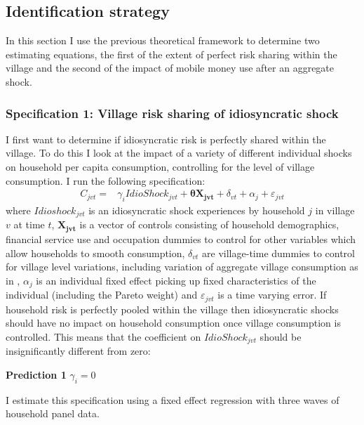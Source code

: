 \clearpage
\subsection{Identification strategy} 
In this section I use the previous theoretical framework to determine two estimating equations, the first of the extent of perfect risk sharing within the village and the second of the impact of mobile money use after an aggregate shock. 

\subsubsection{Specification 1: Village risk sharing of idiosyncratic shock}
I first want to determine if idiosyncratic risk is perfectly shared within the village. To do this I look at the impact of a variety of different individual shocks on household per capita consumption, controlling for the level of village consumption. I run the following specification: 
\begin{align} \label{eq: idioshock}
C_{jvt} = &   \gamma_i IdioShock_{jvt}  + \bm{\theta X_{jvt}}   +  \delta_{vt} + \alpha_j + \varepsilon_{jvt} 
\end{align}
where $Idioshock_{jvt}$ is an idiosyncratic shock experiences by household $j$ in village $v$ at time $t$,  $\bm{X_{jvt}}$ is a vector of controls consisting of household demographics, financial service use and occupation dummies to control for other variables which allow households to smooth consumption, $\delta_{vt}$ are village-time dummies to control for village level variations, including variation of aggregate village consumption as in \cite{ravallion1997risk}, $\alpha_j$ is an individual fixed effect picking up fixed characteristics of the individual (including the Pareto weight) and $\varepsilon_{jvt}$ is a time varying error. If household risk is perfectly pooled within the village then idiosyncratic shocks should have no impact on household consumption once village consumption is controlled. This means that the coefficient on $IdioShock_{jvt}$ should be insignificantly different from zero: 
\begin{description}
\item{\bf{Prediction 1}} $\gamma_i=0$
\end{description}

I estimate this specification using a fixed effect regression with three waves of household panel data.


